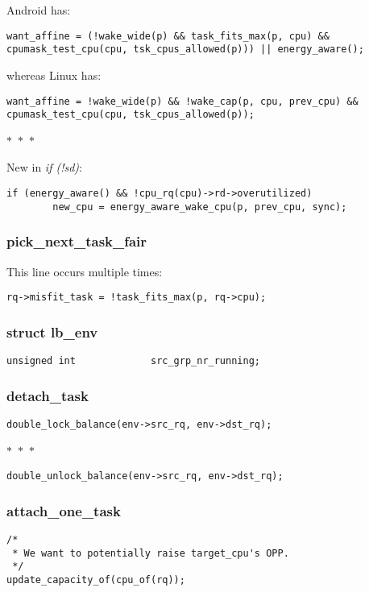 \documentclass{article}
\newcommand{\divider}{{\begin{center}
  $\ast$~$\ast$~$\ast$
\end{center}}}
\begin{document}
Android has:
\begin{verbatim}
want_affine = (!wake_wide(p) && task_fits_max(p, cpu) && cpumask_test_cpu(cpu, tsk_cpus_allowed(p))) || energy_aware();
\end{verbatim}
whereas Linux has:
\begin{verbatim}
want_affine = !wake_wide(p) && !wake_cap(p, cpu, prev_cpu) && cpumask_test_cpu(cpu, tsk_cpus_allowed(p));
\end{verbatim}
\divider
New in \textit{if (!sd)}:
\begin{verbatim}
if (energy_aware() && !cpu_rq(cpu)->rd->overutilized)
        new_cpu = energy_aware_wake_cpu(p, prev_cpu, sync);
\end{verbatim}

\subsubsection{pick\_next\_task\_fair}
This line occurs multiple times:
\begin{verbatim}
rq->misfit_task = !task_fits_max(p, rq->cpu);
\end{verbatim}

\subsubsection{struct lb\_env}
\begin{verbatim}
unsigned int             src_grp_nr_running;
\end{verbatim}

\subsubsection{detach\_task}

\begin{verbatim}
double_lock_balance(env->src_rq, env->dst_rq);
\end{verbatim}
\divider
\begin{verbatim}
double_unlock_balance(env->src_rq, env->dst_rq);
\end{verbatim}

\subsubsection{attach\_one\_task}

\begin{verbatim}
/*
 * We want to potentially raise target_cpu's OPP.
 */
update_capacity_of(cpu_of(rq));
\end{verbatim}
\end{document}
